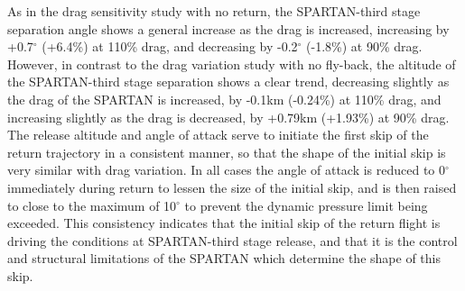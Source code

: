 As in the drag sensitivity study with no return, the SPARTAN-third stage separation angle shows a general increase as the drag is increased, increasing by +0.7$^\circ$ (+6.4\%) at 110\% drag, and decreasing by -0.2$^\circ$ (-1.8\%) at 90\% drag. However, in contrast to the drag variation study with no fly-back,
the altitude of the SPARTAN-third stage separation shows a clear trend, decreasing slightly as the drag of the SPARTAN is increased, by -0.1km (-0.24\%) at 110\% drag, and increasing slightly as the drag is decreased, by +0.79km (+1.93\%) at 90\% drag.  
The release altitude and angle of attack serve to initiate the first skip of the return trajectory in a consistent manner, so that the shape of the initial skip is very similar with drag variation. In all cases the angle of attack is reduced to 0$^\circ$ immediately during return to lessen the size of the initial skip, and is then raised to close to the maximum of 10$^\circ$ to prevent the dynamic pressure limit being exceeded. This consistency indicates that the initial skip of the return flight is driving the conditions at SPARTAN-third stage release, and that it is the control and structural limitations of the SPARTAN which determine the shape of this skip. 



